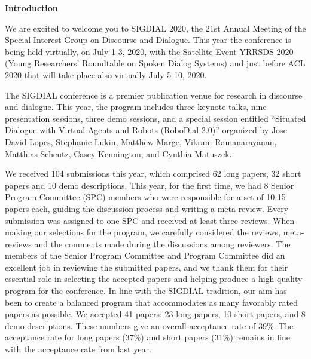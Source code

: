 \documentclass[11pt]{article}
\begin{document}
\begin{center}
  {\Large \bf Introduction}
\end{center}

\vspace*{0.5cm}


We are excited to welcome you to SIGDIAL 2020, the 21st Annual Meeting of the Special Interest Group on Discourse and Dialogue. This year the conference is being held virtually, on July 1-3, 2020, with the Satellite Event YRRSDS 2020 (Young Researchers' Roundtable on Spoken Dialog Systems) and just before ACL 2020 that will take place also virtually July 5-10, 2020.  

The SIGDIAL conference is a premier publication venue for research in discourse and dialogue. This year, the program includes three keynote talks, nine presentation sessions, three demo sessions, and a special session entitled ``Situated Dialogue with Virtual Agents and Robots (RoboDial 2.0)'' organized by Jose David Lopes, Stephanie Lukin, Matthew Marge, Vikram Ramanarayanan,  Matthias Scheutz, Casey Kennington, and Cynthia Matuszek.

We received 104 submissions this year, which comprised 62 long papers, 32 short papers and 10 demo descriptions. This year, for the first time, we had 8 Senior Program Committee (SPC) members who were responsible for a set of 10-15 papers each, guiding the discussion process and writing a meta-review. Every submission was assigned to one SPC and received at least three reviews. When making our selections for the program, we carefully considered the reviews, meta-reviews and the comments made during the discussions among reviewers. The members of the Senior Program Committee and Program Committee did an excellent job in reviewing the submitted papers, and we thank them for their essential role in selecting the accepted papers and helping produce a high quality program for the conference. In line with the SIGDIAL tradition, our aim has been to create a balanced program that accommodates as many favorably rated papers as possible. We accepted 41 papers: 23 long papers, 10 short papers, and 8 demo descriptions. These numbers give an overall acceptance rate of 39\%. The acceptance rate for long papers (37\%) and short papers (31\%) remains in line with the acceptance rate from last year.
\end{document}

